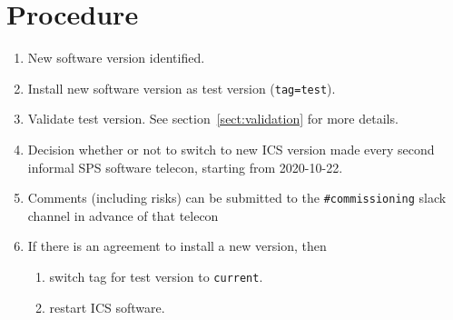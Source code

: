 \section{Procedure}

\begin{enumerate}
\item New software version identified.
\item Install new software version as test version (\verb#tag=test#). 
\item Validate test version. See section~\ref{sect:validation} for more details.
\item Decision whether or not to switch to new ICS version made every
second informal SPS software telecon, starting from 2020-10-22.
\item Comments (including risks) can be submitted to 
the \verb!#commissioning! slack channel in advance of that telecon
\item If there is an agreement to install a new version, then
	\begin{enumerate}
		\item switch tag for test version to \verb#current#.
		\item restart ICS software.
	\end{enumerate}
\end{enumerate}

